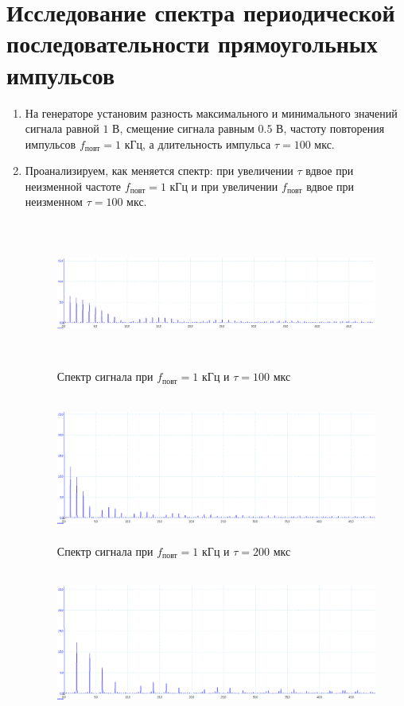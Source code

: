\documentclass[12pt]{article}
\begin{document}
\section*{Исследование спектра периодической последовательности прямоугольных импульсов} 
\begin{enumerate}
	\item
		На генераторе установим разность максимального и минимального значений сигнала равной $1$ В, смещение сигнала равным $0.5$ В, частоту повторения импульсов $f_\text{повт} = 1$ кГц, а длительность импульса $\tau = 100$ мкс.
	\item
		Проанализируем, как меняется спектр: при увеличении $\tau$ вдвое при неизменной частоте $f_\text{повт} = 1$ кГц и при увеличении $f_\text{повт}$ вдвое при неизменном $\tau = 100$ мкс.		
		\begin{figure}[h!]
			\centering
			\includegraphics[width = 14cm, height = 4.8cm]{image2.png}
			\caption{Спектр сигнала при $f_\text{повт} = 1$ кГц и $\tau = 100$ мкс}			
		\end{figure}
		\begin{figure}[h!]
			\centering
			\includegraphics[width = 14cm, height = 4.8cm]{image3.png}
			\caption{Спектр сигнала при $f_\text{повт} = 1$ кГц и $\tau = 200$ мкс}			
		\end{figure}
		\newpage
		\begin{figure}[h!]
			\centering
			\includegraphics[width = 14cm, height = 4.8cm]{image4.png}

\end{figure}
\end{enumerate}
\end{document}
